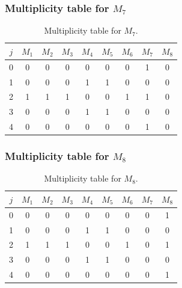 \subsubsection{Multiplicity table for $M_{7}$}

\begin{table}[ht]
\centering
\begin{tabular}{c|cccccccc}
\hline
$j$ & $M_{1}$ & $M_{2}$ & $M_{3}$ & $M_{4}$ & $M_{5}$ & $M_{6}$ & $M_{7}$ & $M_{8}$ \\
\hline
0 & 0 & 0 & 0 & 0 & 0 & 0 & 1 & 0 \\
1 & 0 & 0 & 0 & 1 & 1 & 0 & 0 & 0 \\
2 & 1 & 1 & 1 & 0 & 0 & 1 & 1 & 0 \\
3 & 0 & 0 & 0 & 1 & 1 & 0 & 0 & 0 \\
4 & 0 & 0 & 0 & 0 & 0 & 0 & 1 & 0 \\
\hline
\end{tabular}
\caption{Multiplicity table for $M_{7}$.}
\end{table}

\subsubsection{Multiplicity table for $M_{8}$}

\begin{table}[ht]
\centering
\begin{tabular}{c|cccccccc}
\hline
$j$ & $M_{1}$ & $M_{2}$ & $M_{3}$ & $M_{4}$ & $M_{5}$ & $M_{6}$ & $M_{7}$ & $M_{8}$ \\
\hline
0 & 0 & 0 & 0 & 0 & 0 & 0 & 0 & 1 \\
1 & 0 & 0 & 0 & 1 & 1 & 0 & 0 & 0 \\
2 & 1 & 1 & 1 & 0 & 0 & 1 & 0 & 1 \\
3 & 0 & 0 & 0 & 1 & 1 & 0 & 0 & 0 \\
4 & 0 & 0 & 0 & 0 & 0 & 0 & 0 & 1 \\
\hline
\end{tabular}
\caption{Multiplicity table for $M_{8}$.}
\end{table}

